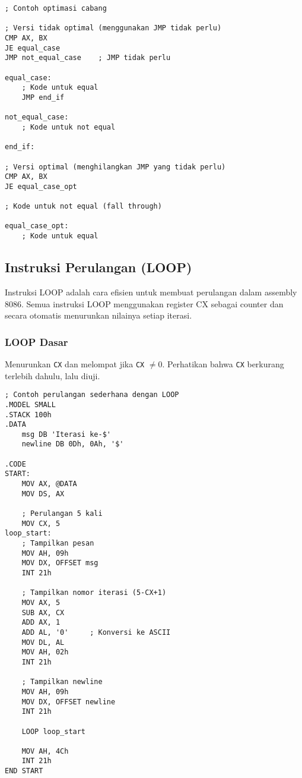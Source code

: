 \documentclass[../main.tex]{subfiles}
\begin{document}
\begin{lstlisting}[language={[x86masm]Assembler}, caption=Contoh Optimasi Cabang, label={lst:branch-optimization}]
; Contoh optimasi cabang

; Versi tidak optimal (menggunakan JMP tidak perlu)
CMP AX, BX
JE equal_case
JMP not_equal_case    ; JMP tidak perlu

equal_case:
    ; Kode untuk equal
    JMP end_if
    
not_equal_case:
    ; Kode untuk not equal
    
end_if:

; Versi optimal (menghilangkan JMP yang tidak perlu)
CMP AX, BX
JE equal_case_opt

; Kode untuk not equal (fall through)

equal_case_opt:
    ; Kode untuk equal
\end{lstlisting}

\subsection{Instruksi Perulangan (LOOP)}
            Instruksi LOOP adalah cara efisien untuk membuat perulangan dalam assembly 8086. Semua instruksi LOOP menggunakan register CX sebagai counter dan secara otomatis menurunkan nilainya setiap iterasi.

            \subsubsection{LOOP Dasar}
Menurunkan \texttt{CX} dan melompat jika \texttt{CX} \(\neq 0\). Perhatikan bahwa \texttt{CX} berkurang terlebih dahulu, lalu diuji.

\begin{lstlisting}[language={[x86masm]Assembler}, caption=Contoh Penggunaan LOOP Dasar, label={lst:loop-basic}]
; Contoh perulangan sederhana dengan LOOP
.MODEL SMALL
.STACK 100h
.DATA
    msg DB 'Iterasi ke-$'
    newline DB 0Dh, 0Ah, '$'
    
.CODE
START:
    MOV AX, @DATA
    MOV DS, AX
    
    ; Perulangan 5 kali
    MOV CX, 5
loop_start:
    ; Tampilkan pesan
    MOV AH, 09h
    MOV DX, OFFSET msg
    INT 21h
    
    ; Tampilkan nomor iterasi (5-CX+1)
    MOV AX, 5
    SUB AX, CX
    ADD AX, 1
    ADD AL, '0'     ; Konversi ke ASCII
    MOV DL, AL
    MOV AH, 02h
    INT 21h
    
    ; Tampilkan newline
    MOV AH, 09h
    MOV DX, OFFSET newline
    INT 21h
    
    LOOP loop_start
    
    MOV AH, 4Ch
    INT 21h
END START
\end{lstlisting}
\end{document}
